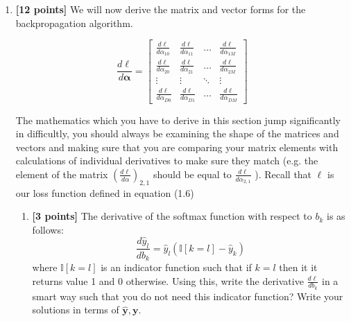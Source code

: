 \documentclass[11pt]{article}
\numberwithin{equation}{section} %
\numberwithin{figure}{section} %
\numberwithin{table}{section} %
\newcommand{\adj}[1]{\frac{d \ell}{d #1}}
\newcommand{\Ib}{\mathbb{I}}
\newcommand{\yv}{\mathbf{y}}
\newcommand{\alphav     }{\boldsymbol \alpha     }
\newcommand{\points}[1]{{\bf [#1 points]}}
\begin{document}
\begin{enumerate}
\begin{enumerate}
        
        
        
        \item \points{1} What are the entries of the output vector $\hat{\yv}$? Your answer should be written in terms of $b_1,b_2,b_3$.
        
        \begin{tcolorbox}[fit,height=4cm, width=15cm, blank, borderline={1pt}{-2pt}]
            \begin{center}\huge$\hat{\yv} = [\frac{\exp(b_1)}{\sum\limits_{l=1}^3 \exp(b_l)}, \frac{\exp(b_2)}{\sum\limits_{l=1}^3 \exp(b_l)}, \frac{\exp(b_3)}{\sum\limits_{l=1}^3 \exp(b_l)}]$
            \end{center}
        \end{tcolorbox}
        
        
        
    \end{enumerate} 
\clearpage
\item \points{12} We will now derive the matrix and vector forms for the backpropagation algorithm.

$$\frac{d\ell}{d\alphav} = 
    \begin{bmatrix}
        \adj{\alpha_{10}} & \adj{\alpha_{11}} & \dots  & \adj{\alpha_{1M}} \\
        \adj{\alpha_{20}} & \adj{\alpha_{21}} & \dots  & \adj{\alpha_{2M}} \\
        \vdots      & \vdots      & \ddots & \vdots \\
        \adj{\alpha_{D0}} & \adj{\alpha_{D1}} & \dots  & \adj{\alpha_{DM}}
    \end{bmatrix}$$




The mathematics which you have to derive in this section jump significantly in difficultly, you should always be examining the shape of the matrices and vectors and making sure that you are comparing your matrix elements with calculations of individual derivatives to make sure they match (e.g. the element of the matrix $(\frac{d\ell}{d\alpha})_{2,1}$ should be equal to $\frac{d\ell}{d\alpha_{2,1}}$  ). Recall that $\ell$ is our loss function defined in equation (1.6)
    
    \begin{enumerate}
        \item \points{3} The derivative of the softmax function with respect to $b_k$ is as follows:
        $$\frac{d\hat{y}_l}{db_k} = \hat{y}_l(\Ib[k=l]-\hat{y}_k)$$ 
        where $\Ib[k=l]$ is an indicator function such that if $k=l$ then it it returns value 1 and 0 otherwise. 
        Using this, write the derivative $\frac{d\ell}{db_k}$ in a smart way such that you do not need this indicator function? Write your solutions in terms of $\hat{\yv},\yv$.
        

\end{enumerate}
\end{enumerate}
\end{document}
